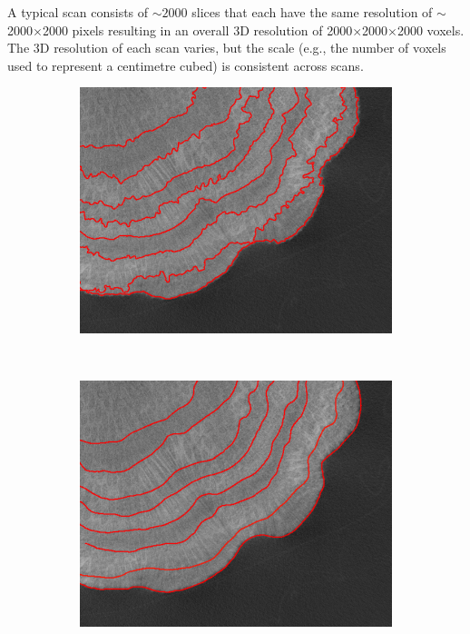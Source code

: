 A typical scan consists of ${\sim}2000$ slices that each have the same resolution of ${\sim}$2000$\times$2000 pixels resulting in an overall 3D resolution of 2000$\times$2000$\times$2000 voxels. The 3D resolution of each scan varies, but the scale (e.g., the number of voxels used to represent a centimetre cubed) is consistent across scans.

\begin{figure}[t]
    \centering
    \begin{subfigure}[t]{0.49\textwidth}
        \centering
        \includegraphics[width=1\textwidth, valign=c]{images/rough-label.png}
    \end{subfigure}
    ~
    \begin{subfigure}[t]{0.49\textwidth}
        \centering
        \includegraphics[width=1\textwidth, valign=c]{images/smooth-label.png}

\end{subfigure}
\end{figure}
